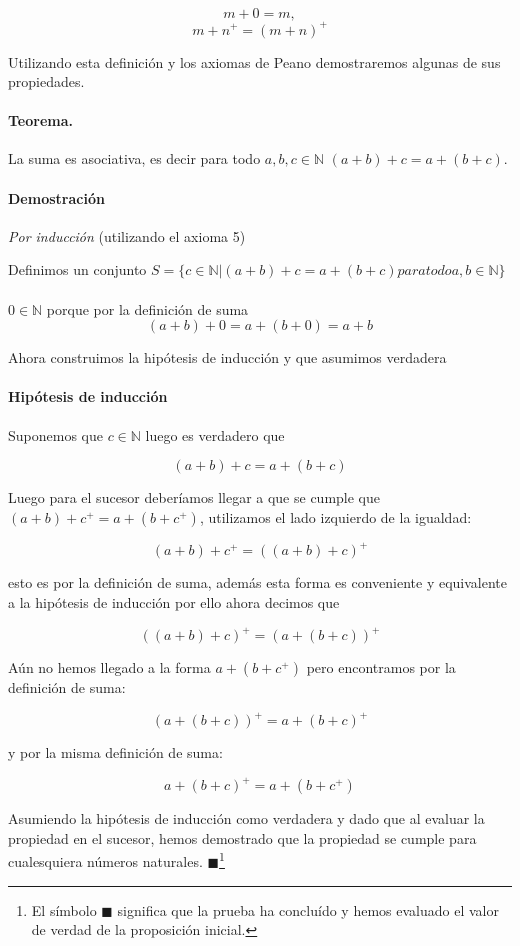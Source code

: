 \documentclass{article}
\begin{document}
$$m + 0 = m,$$
$$m + n^+ = (m + n)^+$$

Utilizando esta definición y los axiomas de Peano demostraremos algunas de sus propiedades.

\paragraph{Teorema.} La suma es asociativa, es decir para todo $a,b,c \in \mathbb{N}$ $(a + b) + c = a + (b + c)$.

\paragraph{Demostración} \textit{Por inducción} (utilizando el axioma 5)

Definimos un conjunto $S = \{c \in \mathbb{N} | (a + b) + c = a + (b + c) para todo a,b \in \mathbb{N}\}$

\paragraph{} $0 \in \mathbb{N}$ porque por la definición de suma
$$ (a + b) + 0 = a + (b + 0) = a + b$$

Ahora construimos la hipótesis de inducción y que asumimos verdadera
\paragraph{Hipótesis de inducción} Suponemos que $c \in \mathbb{N}$ luego es verdadero que

$$(a + b) + c = a + (b + c)$$

Luego para el sucesor deberíamos llegar a que se cumple que $(a + b) + c^+ = a + (b + c^+)$, utilizamos el lado izquierdo de la igualdad:

    $$(a + b) + c^+ = ((a + b) + c)^+$$

esto es por la definición de suma, además esta forma es conveniente y equivalente a la hipótesis de inducción por ello ahora decimos que

$$((a + b) + c)^+ = (a + (b + c))^+$$

Aún no hemos llegado a la forma $a + (b + c^+)$ pero encontramos por la definición de suma:

$$(a + (b + c))^+ = a + (b + c)^+$$

y por la misma definición de suma:

$$a + (b + c)^+ = a + (b + c^+)$$

Asumiendo la hipótesis de inducción como verdadera y dado que al evaluar la propiedad en el sucesor, hemos demostrado que la propiedad se cumple para cualesquiera números naturales. $\blacksquare$\footnote{El símbolo $\blacksquare$ significa que la prueba ha concluído y hemos evaluado el valor de verdad de la proposición inicial.}
\end{document}
